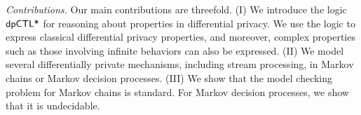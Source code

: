 \noindent
\emph{Contributions.} Our main contributions are threefold. (I)
We introduce the logic $\textsf{dpCTL*}$ for reasoning about properties in
differential privacy. We use the logic to express classical
differential privacy properties, and moreover, complex properties such as those
involving infinite behaviors can also be expressed. (II) We model several differentially private mechanisms, including stream processing, in Markov chains or Markov decision processes.
(III) We show that the model checking
problem for Markov chains is standard. For Markov decision processes, we show that it is undecidable.
